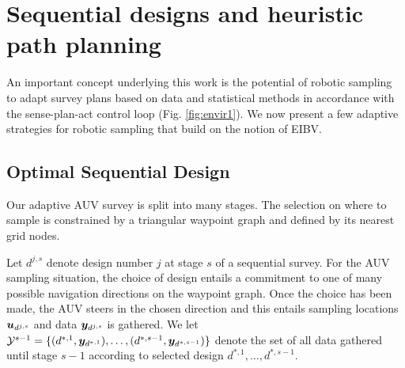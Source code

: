 \documentclass[aoas]{imsart}
\begin{document}






\section{Sequential designs and heuristic path planning}\label{sec:heuristics}

An important concept underlying this work is the potential of robotic
sampling to adapt survey plans based on data and statistical methods
in accordance with the sense-plan-act control loop
(Fig. \ref{fig:envir1}). We now present a few adaptive strategies for
robotic sampling that build on the notion of EIBV.

\subsection{Optimal Sequential Design}
\label{Optdes}

Our adaptive AUV survey is split into many stages. The selection on
where to sample is constrained by a triangular waypoint graph and
defined by its nearest grid nodes.

Let $d^{j,s}$ denote design number $j$ at stage $s$ of a sequential
survey. For the AUV sampling situation, the choice of design entails a commitment to one of many possible navigation directions on the waypoint graph. Once the choice has been made, the AUV steers in the chosen direction and this entails sampling locations ${\boldsymbol u}_{d^{j,s}}$ and data ${\boldsymbol y}_{d^{j,s}}$ is gathered.  We let
$\mathcal{Y}^{s-1} =\{(d^{*,1}, {\boldsymbol y}_{d^{*,1}}),\ldots, (d^{*,s-1},
{\boldsymbol y}_{d^{*,s-1}}) \}$ denote the set of all data gathered until stage
$s-1$ according to selected design $d^{*,1},\ldots,d^{*,s-1}$.  
\end{document}
